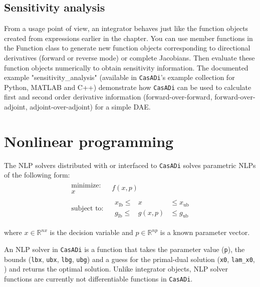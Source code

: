 \documentclass[a4paper,12pt]{book}
\newcommand{\CasADi}{\texttt{CasADi}\xspace}
\newcommand{\lb}{\text{lb}}
\newcommand{\ub}{\text{ub}}
\begin{document}
\subsection{Sensitivity analysis}
From a usage point of view, an integrator behaves just like the function objects created from expressions earlier in the chapter.
You can use member functions in the Function class to generate new function objects corresponding to directional derivatives (forward or reverse mode) or complete Jacobians. Then evaluate these function objects numerically to obtain sensitivity information. The documented example "sensitivity\_analysis" (available in \CasADi's example collection for Python, MATLAB and C++) demonstrate how \CasADi can be used to calculate first and second order derivative information (forward-over-forward, forward-over-adjoint, adjoint-over-adjoint) for a simple DAE.

\section{Nonlinear programming} \label{sec:nlpsol}
The NLP solvers distributed with or interfaced to \CasADi solves parametric NLPs of the following form:
\begin{equation} \label{eq:nlp}
\begin{array}{cc}
\begin{array}{c}
\text{minimize:} \\
x
\end{array}
&
f(x,p)
\\
\begin{array}{c}
\text{subject to:}
\end{array}
&
\begin{array}{rcl}
  x_{\lb} \le &  x   & \le x_{\ub} \\
  g_{\lb} \le &g(x,p)& \le g_{\ub}
\end{array}
\end{array}
\end{equation}

where $x \in \mathbb{R}^{nx}$ is the decision variable and $p \in \mathbb{R}^{np}$ is a known parameter vector.

An NLP solver in \CasADi is a function that takes the parameter value (\texttt{p}), the bounds (\texttt{lbx}, \texttt{ubx}, \texttt{lbg}, \texttt{ubg}) and a guess for the primal-dual solution (\texttt{x0}, \texttt{lam_x0}, ) and returns the optimal solution. Unlike integrator objects, NLP solver functions are currently not differentiable functions in \CasADi.
\end{document}

